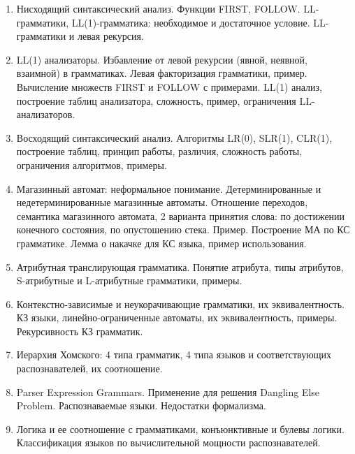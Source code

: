 \documentclass[12pt]{article}
\newcommand{\litem}[1]{\item #1 }%
\begin{document}
\begin{enumerate}
\litem {Нисходящий синтаксический анализ. Функции FIRST, FOLLOW. LL-грамматики, LL(1)-грамматика: необходимое и достаточное условие. LL-грамматики и левая рекурсия.}
\litem {LL(1) анализаторы. Избавление от левой рекурсии (явной, неявной, взаимной) в грамматиках. Левая факторизация грамматики, пример. Вычисление множеств FIRST и FOLLOW с примерами. LL(1) анализ, построение таблиц анализатора, сложность, пример, ограничения LL-анализаторов.}
\litem {Восходящий синтаксический анализ. Алгоритмы LR(0), SLR(1), CLR(1), построение таблиц, принцип работы, различия, сложность работы, ограничения алгоритмов, примеры.}
\litem {Магазинный автомат: неформальное понимание. Детерминированные и недетерминированные магазинные автоматы. Отношение переходов, семантика магазинного автомата, 2 варианта принятия слова: по достижении конечного состояния, по опустошению стека. Пример. Построение МА по КС грамматике. Лемма о накачке для КС языка, пример использования.}
\litem {Атрибутная транслирующая грамматика. Понятие атрибута, типы атрибутов, S-атрибутные и L-атрибутные грамматики, примеры.}
\litem {Контекстно-зависимые и неукорачивающие грамматики, их эквивалентность. КЗ языки, линейно-ограниченные автоматы, их эквивалентность, примеры. Рекурсивность КЗ грамматик.}
\litem {Иерархия Хомского: 4 типа грамматик, 4 типа языков и соответствующих распознавателей, их соотношение.}
\litem {Parser Expression Grammars. Применение для решения Dangling Else Problem. Распознаваемые языки. Недостатки формализма.} 
\litem {Логика и ее соотношение с грамматиками, конъюнктивные и булевы логики. Классификация языков по вычислительной мощности распознавателей.}

\end{enumerate}
\end{document}
